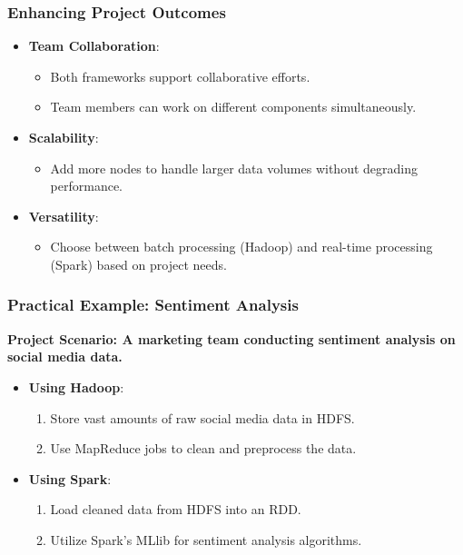 \documentclass{beamer}
\begin{document}
\begin{frame}
    \frametitle{Enhancing Project Outcomes}
    \begin{itemize}
        \item \textbf{Team Collaboration}:
            \begin{itemize}
                \item Both frameworks support collaborative efforts.
                \item Team members can work on different components simultaneously.
            \end{itemize}
        \item \textbf{Scalability}:
            \begin{itemize}
                \item Add more nodes to handle larger data volumes without degrading performance.
            \end{itemize}
        \item \textbf{Versatility}:
            \begin{itemize}
                \item Choose between batch processing (Hadoop) and real-time processing (Spark) based on project needs.
            \end{itemize}
    \end{itemize}
\end{frame}

\begin{frame}
    \frametitle{Practical Example: Sentiment Analysis}
    \textbf{Project Scenario: A marketing team conducting sentiment analysis on social media data.}
    
    \begin{itemize}
        \item \textbf{Using Hadoop}:
            \begin{enumerate}
                \item Store vast amounts of raw social media data in HDFS.
                \item Use MapReduce jobs to clean and preprocess the data.
            \end{enumerate}
        \item \textbf{Using Spark}:
            \begin{enumerate}
                \item Load cleaned data from HDFS into an RDD.
                \item Utilize Spark's MLlib for sentiment analysis algorithms.
            \end{enumerate}
    \end{itemize}
\end{frame}
\end{document}
